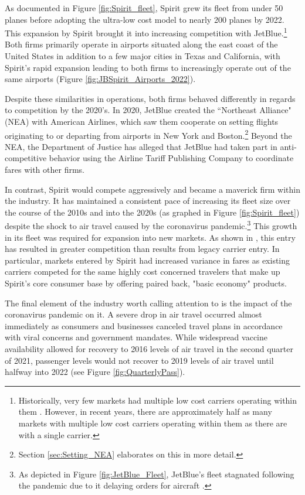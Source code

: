 \documentclass{article}
\begin{document}
	 As documented in Figure \ref{fig:Spirit_fleet}, Spirit grew its fleet from under 50 planes before adopting the ultra-low cost model to nearly 200 planes by 2022. This expansion by Spirit brought it into increasing competition with JetBlue.\footnote{Historically, very few markets had multiple low cost carriers operating within them \citep{kwoka_fringe_2016, ciliberto_market_2021}. However, in recent years, there are approximately half as many markets with multiple low cost carriers operating within them as there are with a single carrier.} Both firms primarily operate in airports situated along the east coast of the United States in addition to a few major cities in Texas and California, with Spirit's rapid expansion leading to both firms to increasingly operate out of the same airports (Figure \ref{fig:JBSpirit_Airports_2022}).
	
	Despite these similarities in operations, both firms behaved differently in regards to competition by the 2020's.  In 2020, JetBlue created the ``Northeast Alliance" (NEA) with American Airlines, which saw them cooperate on setting flights originating to or departing from airports in New York and Boston.\footnote{Section \ref{sec:Setting_NEA} elaborates on this in more detail.} Beyond the NEA, the Department of Justice has alleged that JetBlue had taken part in anti-competitive behavior using the Airline Tariff Publishing Company to coordinate fares with other firms. 
	
	In contrast, Spirit would compete aggressively and became a maverick firm within the industry. It has maintained a consistent pace of increasing its fleet size over the course of the 2010s and into the 2020s (as graphed in Figure \ref{fig:Spirit_fleet}) despite the shock to air travel caused by the coronavirus pandemic.\footnote{As depicted in Figure \ref{fig:JetBlue_Fleet}, JetBlue's fleet stagnated following the pandemic due to it delaying orders for aircraft \citep{bellamy_iii_jetblue_2020, sipinski_jetblue_2020}.} This growth in its fleet was required for expansion into new markets. As shown in \citet{shrago_spirit_2024}, this entry has resulted in greater competition than results from legacy carrier entry. In particular, markets entered by Spirit had increased variance in fares as existing carriers competed for the same highly cost concerned travelers that make up Spirit's core consumer base by offering paired back, "basic economy" products.
	
	The final element of the industry worth calling attention to is the impact of the coronavirus pandemic on it.  A severe drop in air travel occurred almost immediately as consumers and businesses canceled travel plans in accordance with viral concerns and government mandates. While widespread vaccine availability allowed for recovery to 2016 levels of air travel in the second quarter of 2021, passenger levels would not recover to 2019 levels of air travel until halfway into 2022 (see Figure \ref{fig:QuarterlyPass}). 
\end{document}
